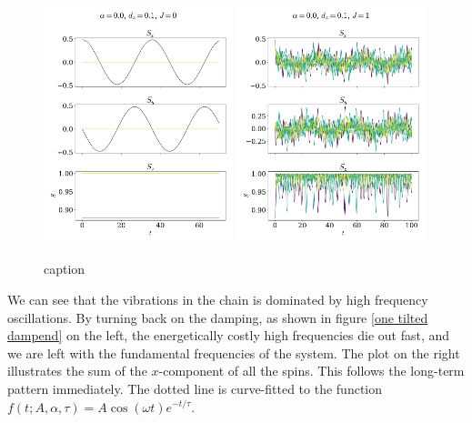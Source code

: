 \documentclass{article}
\begin{document}
    \begin{figure}
        \centering
        \includegraphics[width=0.49\textwidth]{../plots/2221.pdf}
        \includegraphics[width=0.49\textwidth]{../plots/2222.pdf}
        \caption{caption}
        \label{one tilted}
    \end{figure}

    We can see that the vibrations in the chain is dominated by high frequency oscillations. By turning back on the damping, as shown in figure \ref{one tilted dampend} on the left, the energetically costly high frequencies die out fast, and we are left with the fundamental frequencies of the system. The plot on the right illustrates the sum of the $x$-component of all the spins. This follows the long-term pattern immediately. The dotted line is curve-fitted to the function $f(t; A, \alpha, \tau) = A \cos(\omega t) e^{-t/\tau}$.
\end{document}
